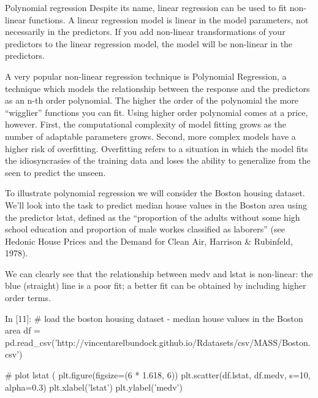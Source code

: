 \begin{frame}[fragile]
	\Large
Polynomial regression
Despite its name, linear regression can be used to fit non-linear functions. A linear regression model is linear in the model parameters, not necessarily in the predictors. If you add non-linear transformations of your predictors to the linear regression model, the model will be non-linear in the predictors.
\end{frame}

\begin{frame}[fragile]
	\Large
A very popular non-linear regression technique is Polynomial Regression, a technique which models the relationship between the response and the predictors as an n-th order polynomial. The higher the order of the polynomial the more “wigglier” functions you can fit. Using higher order polynomial comes at a price, however. First, the computational complexity of model fitting grows as the number of adaptable parameters grows. Second, more complex models have a higher risk of overfitting. Overfitting refers to a situation in which the model fits the idiosyncrasies of the training data and loses the ability to generalize from the seen to predict the unseen.
\end{frame}

\begin{frame}[fragile]
	\Large
To illustrate polynomial regression we will consider the Boston housing dataset. We’ll look into the task to predict median house values in the Boston area using the predictor lstat, defined as the “proportion of the adults without some high school education and proportion of male workes classified as laborers” (see Hedonic House Prices and the Demand for Clean Air, Harrison & Rubinfeld, 1978).

We can clearly see that the relationship between medv and lstat is non-linear: the blue (straight) line is a poor fit; a better fit can be obtained by including higher order terms.
\end{frame}

\begin{frame}[fragile]
	\Large
In [11]:
# load the boston housing dataset - median house values in the Boston area
df = pd.read_csv('http://vincentarelbundock.github.io/Rdatasets/csv/MASS/Boston.csv')

# plot lstat (%
plt.figure(figsize=(6 * 1.618, 6))
plt.scatter(df.lstat, df.medv, s=10, alpha=0.3)
plt.xlabel('lstat')
plt.ylabel('medv')
\end{frame}

